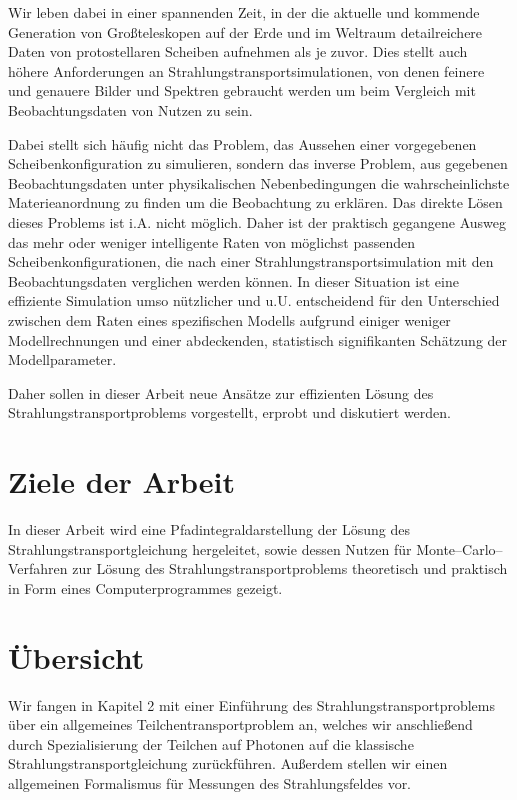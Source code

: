 	Wir leben dabei in einer spannenden Zeit, in der die aktuelle und kommende Generation von Großteleskopen auf der Erde und im Weltraum detailreichere Daten von protostellaren Scheiben aufnehmen als je zuvor. Dies stellt auch höhere Anforderungen an Strahlungstransportsimulationen, von denen feinere und genauere Bilder und Spektren gebraucht werden um beim Vergleich mit Beobachtungsdaten von Nutzen zu sein.
	
	Dabei stellt sich häufig nicht das Problem, das Aussehen einer vorgegebenen Scheibenkonfiguration zu simulieren, sondern das inverse Problem, aus gegebenen Beobachtungsdaten unter physikalischen Nebenbedingungen die wahrscheinlichste Materieanordnung zu finden um die Beobachtung zu erklären. Das direkte Lösen dieses Problems ist i.A. nicht möglich. Daher ist der praktisch gegangene Ausweg das mehr oder weniger intelligente Raten von möglichst passenden Scheibenkonfigurationen, die nach einer Strahlungstransportsimulation mit den Beobachtungsdaten verglichen werden können. In dieser Situation ist eine effiziente Simulation umso nützlicher und u.U. entscheidend für den Unterschied zwischen dem Raten eines spezifischen Modells aufgrund einiger weniger Modellrechnungen und einer abdeckenden, statistisch signifikanten Schätzung der Modellparameter.
	
	Daher sollen in dieser Arbeit neue Ansätze zur effizienten Lösung des Strahlungstransportproblems vorgestellt, erprobt und diskutiert werden.
	
	\section{Ziele der Arbeit}
	In dieser Arbeit wird eine Pfadintegraldarstellung der Lösung des Strahlungstransportgleichung hergeleitet, sowie dessen Nutzen für Monte--Carlo--Verfahren zur Lösung des Strahlungstransportproblems theoretisch und praktisch in Form eines Computerprogrammes gezeigt.
	
	\section{Übersicht}
	Wir fangen in Kapitel 2 mit einer Einführung des Strahlungstransportproblems über ein allgemeines Teilchentransportproblem an, welches wir anschließend durch Spezialisierung der Teilchen auf Photonen auf die klassische Strahlungstransportgleichung zurückführen. Außerdem stellen wir einen allgemeinen Formalismus für Messungen des Strahlungsfeldes vor.
	
